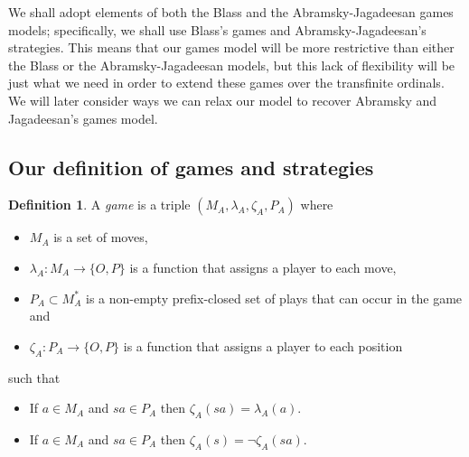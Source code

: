\documentclass[11pt]{article} %
\theoremstyle{plain} %
\theoremstyle{definition} %
\newtheorem{definition}[theorem]{Definition}
\theoremstyle{note}
\theoremstyle{exercisestyle}
\newcommand*\from{\colon}
\newcommand{\cmap}[3]{#1\from{}#2\to{}#3}
\newcommand{\OP}{\{O,P\}}
\begin{document}
We shall adopt elements of both the Blass and the Abramsky-Jagadeesan games models; specifically, we shall use Blass's games and Abramsky-Jagadeesan's strategies.  This means that our games model will be more restrictive than either the Blass or the Abramsky-Jagadeesan models, but this lack of flexibility will be just what we need in order to extend these games over the transfinite ordinals.  We will later consider ways we can relax our model to recover Abramsky and Jagadeesan's games model.

\subsection{Our definition of games and strategies}

\begin{definition}
  A \emph{game} is a triple $(M_A,\lambda_A,\zeta_A,P_A)$ where
  \begin{itemize}
    \item $M_A$ is a set of moves,
    \item $\cmap{\lambda_A}{M_A}{\OP}$ is a function that assigns a player to each move,
    \item $P_A\subset M_A^*$ is a non-empty prefix-closed set of plays that can occur in the game and
    \item $\cmap{\zeta_A}{P_A}{\OP}$ is a function that assigns a player to each position
  \end{itemize}
  such that
  \begin{itemize}
    \item If $a\in M_A$ and $sa\in P_A$ then $\zeta_A(sa)=\lambda_A(a)$.
    \item If $a\in M_A$ and $sa\in P_A$ then $\zeta_A(s)=\neg\zeta_A(sa)$.
  \end{itemize}
\end{definition}
\end{document}
